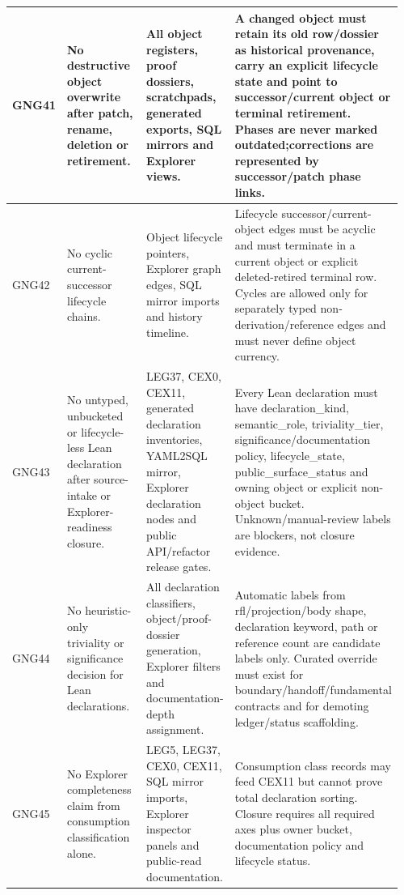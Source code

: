 \begin{longtable}{L{0.045\linewidth} L{0.345\linewidth} L{0.185\linewidth} L{0.39\linewidth}}
\hline
\addlinespace[0.24em]
GNG41 & No destructive object overwrite after patch, rename, deletion or retirement. & All object registers, proof dossiers, scratchpads, generated exports, SQL mirrors and Explorer views. & A changed object must retain its old row/\allowbreak{}dossier as historical provenance, carry an explicit lifecycle state and point to successor/\allowbreak{}current object or terminal retirement. Phases are never marked outdated;\newline corrections are represented by successor/\allowbreak{}patch phase links.\\
\hline
\addlinespace[0.24em]
GNG42 & No cyclic current-successor lifecycle chains. & Object lifecycle pointers, Explorer graph edges, SQL mirror imports and history timeline. & Lifecycle successor/\allowbreak{}current-object edges must be acyclic and must terminate in a current object or explicit deleted-retired terminal row. Cycles are allowed only for separately typed non-derivation/\allowbreak{}reference edges and must never define object currency.\\
\hline
\addlinespace[0.24em]
GNG43 & No untyped, unbucketed or lifecycle-less Lean declaration after source-intake or Explorer-readiness closure. & LEG37, CEX0, CEX11, generated declaration inventories, YAML2SQL mirror, Explorer declaration nodes and public API/\allowbreak{}refactor release gates. & Every Lean declaration must have declaration\_kind, semantic\_role, triviality\_tier, significance/\allowbreak{}documentation policy, lifecycle\_state, public\_surface\_status and owning object or explicit non-object bucket. Unknown/\allowbreak{}manual-review labels are blockers, not closure evidence.\\
\hline
\addlinespace[0.24em]
GNG44 & No heuristic-only triviality or significance decision for Lean declarations. & All declaration classifiers, object/\allowbreak{}proof-dossier generation, Explorer filters and documentation-depth assignment. & Automatic labels from rfl/\allowbreak{}projection/\allowbreak{}body shape, declaration keyword, path or reference count are candidate labels only. Curated override must exist for boundary/\allowbreak{}handoff/\allowbreak{}fundamental contracts and for demoting ledger/\allowbreak{}status scaffolding.\\
\hline
\addlinespace[0.24em]
GNG45 & No Explorer completeness claim from consumption classification alone. & LEG5, LEG37, CEX0, CEX11, SQL mirror imports, Explorer inspector panels and public-read documentation. & Consumption class records may feed CEX11 but cannot prove total declaration sorting. Closure requires all required axes plus owner bucket, documentation policy and lifecycle status.\\

\end{longtable}
